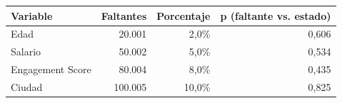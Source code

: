 \begin{tabular}{lrrr}
\toprule
Variable & Faltantes & Porcentaje & p (faltante vs. estado) \\
\midrule
Edad & 20.001 & 2,0\% & 0,606 \\
Salario & 50.002 & 5,0\% & 0,534 \\
Engagement Score & 80.004 & 8,0\% & 0,435 \\
Ciudad & 100.005 & 10,0\% & 0,825 \\
\bottomrule
\end{tabular}
